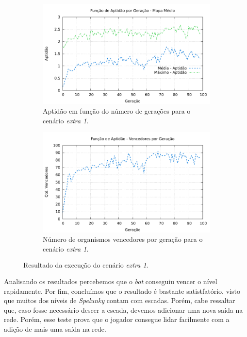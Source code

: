 \begin{figure}[H]
\centering
	\begin{subfigure}[b]{0.4\textwidth}
        \includegraphics[width=\textwidth]{fig/extra1-fitness.pdf}
        \caption{Aptidão em função do número de gerações para o cenário
        \textit{extra 1}.}
	\end{subfigure}
	\begin{subfigure}[b]{0.4\textwidth}
        \includegraphics[width=\textwidth]{fig/extra1-winners.pdf}
        \caption{Número de organismos vencedores por geração para o cenário
        \textit{extra 1}.}
	\end{subfigure}

    \caption{Resultado da execução do cenário \textit{extra 1}.}
	\label{fig:extra1-results}
\end{figure}

Analisando os resultados percebemos que o \textit{bot} conseguiu vencer o nível
rapidamente. Por fim, concluímos que o resultado é bastante satistfatório,
visto que muitos dos níveis de \textit{Spelunky} contam com escadas. Porém,
cabe ressaltar que, caso fosse necessário descer a escada, devemos adicionar
uma nova saída na rede. Porém, esse teste prova que o jogador consegue lidar
facilmente com a adição de mais uma saída na rede.

